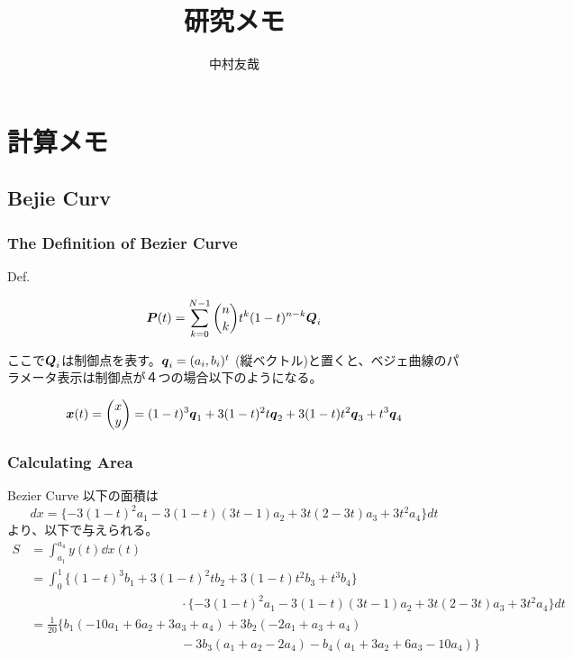\documentclass{ltjsarticle}
\begin{document}
\title{研究メモ}
\author{中村友哉}
\maketitle
\section{計算メモ}
\subsection{Bejie Curv}
\subsubsection{The Definition of Bezier Curve}
Def.

\begin{equation}
  \vb*{P}(t)=\sum_{k=0}^{N-1}\binom{n}{k}t^k(1-t)^{n-k}\vb*{Q}_i
\end{equation}

ここで$\vb*{Q}_i$は制御点を表す。$\vb*{q}_i=(a_i,b_i)^t$ (縦ベクトル)と置くと、ベジェ曲線のパラメータ表示は制御点が４つの場合以下のようになる。

\begin{equation}
  \vb*{x}(t)=
  \begin{pmatrix}
    x \\ y  
  \end{pmatrix}
  =(1-t)^3\vb*{q}_1+3(1-t)^2t\vb*{q}_2+3(1-t)t^2\vb*{q}_3+t^3\vb*{q}_4
\end{equation}
\subsubsection{Calculating Area}
Bezier Curve 以下の面積は
\begin{equation}
  dx=\{-3(1-t)^2a_1-3(1-t)(3t-1)a_2+3t(2-3t)a_3+3t^2a_4\}dt
\end{equation}
より、以下で与えられる。
\begin{equation}
  \begin{split}
    S&=\int_{a_1}^{a_4}y(t)\dd{x(t)}\\
    &=\int_{0}^{1}\{(1-t)^3b_1+3(1-t)^2tb_2+3(1-t)t^2b_3+t^3b_4\}\\
    & \hspace{5cm}\cdot \{-3(1-t)^2a_1-3(1-t)(3t-1)a_2+3t(2-3t)a_3+3t^2a_4\}dt\\
    &=\frac{1}{20}\{b_1(-10a_1+6a_2+3a_3+a_4)+3b_2(-2a_1+a_3+a_4)\\
    & \hspace{5cm}-3b_3(a_1+a_2-2a_4)-b_4(a_1+3a_2+6a_3-10a_4)\}\\
  \end{split}
\end{equation}
\end{document}
